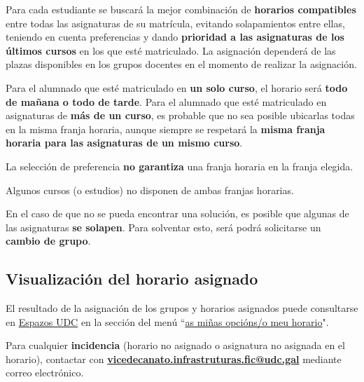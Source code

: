 Para cada estudiante se buscará la mejor combinación de \textbf{horarios compatibles} entre todas las asignaturas de su matrícula, evitando solapamientos entre ellas, teniendo en cuenta preferencias y dando \textbf{prioridad a las asignaturas de los últimos cursos} en los que esté matriculado. La asignación dependerá de las plazas disponibles en los grupos docentes en el momento de realizar la asignación.

Para el alumnado que esté matriculado en \textbf{un solo curso}, el horario será \textbf{todo de mañana o todo de tarde}. Para el alumnado que esté matriculado en asignaturas de \textbf{más de un curso}, es probable que no sea posible ubicarlas todas en la misma franja horaria, aunque siempre se respetará la \textbf{misma franja horaria para las asignaturas de un mismo curso}.

\begin{warningBox}
    La selección de preferencia \textbf{no garantiza} una franja horaria en la franja elegida.
\end{warningBox}

\begin{warningBox}
    Algunos cursos (o estudios) no disponen de ambas franjas horarias.
\end{warningBox}

\begin{importantBox}
    En el caso de que no se pueda encontrar una solución, es posible que algunas de las asignaturas \textbf{se solapen}. Para solventar esto, será podrá solicitarse un \textbf{cambio de grupo}.
\end{importantBox}

\subsection{Visualización del horario asignado}

El resultado de la asignación de los grupos y horarios asignados puede consultarse en \href{\linkEspazosUDC}{Espazos UDC} en la sección del menú  ``\href{https://espazos.udc.es/centers/614/timetable/preference}{as miñas opcións/o meu horario}".

\begin{importantBox}
    Para cualquier \textbf{incidencia} (horario no asignado o asignatura no asignada en el horario), contactar con \href{mailto:vicedecanato.infrastruturas.fic@udc.gal}{\textbf{vicedecanato.infrastruturas.fic@udc.gal}} mediante correo electrónico.
\end{importantBox}

